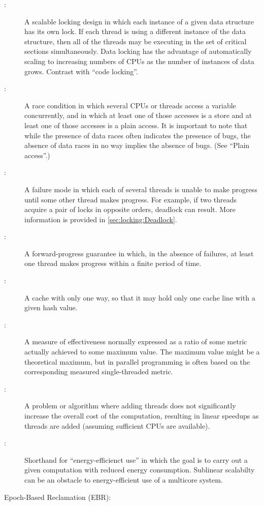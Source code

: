 \begin{description}
\item[:]
	A scalable locking design in which each instance of a given
	data structure has its own lock.
	If each thread is using a different instance of the
	data structure, then all of the threads may be executing in
	the set of critical sections simultaneously.
	Data locking has the advantage of automatically scaling to
	increasing numbers of CPUs as the number of instances of
	data grows.
	Contrast with ``code locking''.
\item[:]
	A race condition in which several CPUs or threads access
	a variable concurrently, and in which at least one of those
	accesses is a store and at least one of those accesses
	is a plain access.
	It is important to note that while the presence of data races
	often indicates the presence of bugs, the absence of data races
	in no way implies the absence of bugs.
	(See ``Plain access''.)
\item[:]
	A failure mode in which each of several threads is unable to
	make progress until some other thread makes progress.
	For example, if two threads acquire a pair of locks in opposite
	orders, deadlock can result.
	More information is provided in
	\cref{sec:locking:Deadlock}.
\item[:]
	A forward-progress guarantee in which, in the absence of
	failures, at least one thread makes progress within a finite
	period of time.
\item[:]
	A cache with only one way, so that it may hold only one cache
	line with a given hash value.
\item[:]
	A measure of effectiveness normally expressed as a ratio
	of some metric actually achieved to some maximum value.
	The maximum value might be a theoretical maximum, but in
	parallel programming is often based on the corresponding
	measured single-threaded metric.
\item[:]
	A problem or algorithm where adding threads does not significantly
	increase the overall cost of the computation, resulting in
	linear speedups as threads are added (assuming sufficient
	CPUs are available).
\item[:]
	Shorthand for ``energy-efficienct use'' in which the goal is to
	carry out a given computation with reduced energy consumption.
	Sublinear scalabilty can be an obstacle to energy-efficient use
	of a multicore system.
\item[Epoch-Based Reclamation (EBR):]

\end{description}
